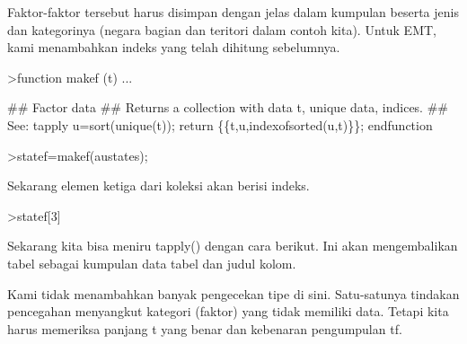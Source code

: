 \documentclass[a4paper,10pt]{article}
\begin{document}
\begin{eulernotebook}
\begin{eulercomment}
\begin{eulercomment}
\begin{eulercomment}
\begin{eulercomment}
\begin{eulercomment}
\begin{eulercomment}
\begin{eulercomment}
Faktor-faktor tersebut harus disimpan dengan jelas dalam kumpulan
beserta jenis dan kategorinya (negara bagian dan teritori dalam contoh
kita). Untuk EMT, kami menambahkan indeks yang telah dihitung
sebelumnya.
\end{eulercomment}
\begin{eulerprompt}
>function makef (t) ...
\end{eulerprompt}
\begin{eulerudf}
  ## Factor data
  ## Returns a collection with data t, unique data, indices.
  ## See: tapply
  u=sort(unique(t));
  return \{\{t,u,indexofsorted(u,t)\}\};
  endfunction
\end{eulerudf}
\begin{eulerprompt}
>statef=makef(austates);
\end{eulerprompt}
\begin{eulercomment}
Sekarang elemen ketiga dari koleksi akan berisi indeks.
\end{eulercomment}
\begin{eulerprompt}
>statef[3]
\end{eulerprompt}
\begin{euleroutput}
  [6,  5,  4,  2,  2,  3,  8,  8,  4,  7,  2,  7,  4,  4,  5,  6,  5,  3,
  8,  7,  4,  2,  2,  8,  5,  1,  2,  7,  7,  1]
\end{euleroutput}
\begin{eulercomment}
Sekarang kita bisa meniru tapply() dengan cara berikut. Ini akan
mengembalikan tabel sebagai kumpulan data tabel dan judul kolom.
\end{eulercomment}
\begin{eulercomment}
Kami tidak menambahkan banyak pengecekan tipe di sini. Satu-satunya
tindakan pencegahan menyangkut kategori (faktor) yang tidak memiliki
data. Tetapi kita harus memeriksa panjang t yang benar dan kebenaran
pengumpulan tf.


\end{eulercomment}
\end{eulercomment}
\end{eulercomment}
\end{eulercomment}
\end{eulercomment}
\end{eulercomment}
\end{eulercomment}
\end{eulernotebook}
\end{document}
